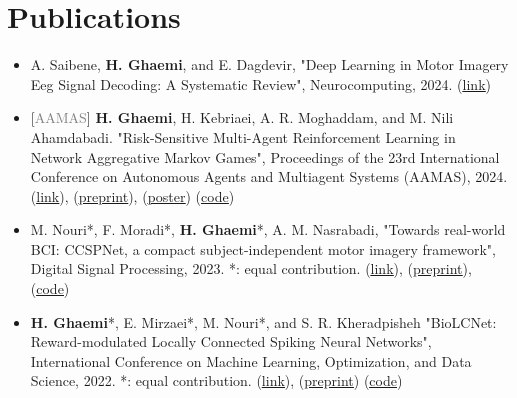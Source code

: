 \documentclass[A4,11pt]{article}
\makeatletter
\newcommand{\CVItem}[1]{
  \item\small{
    {#1 \vspace{-2pt}}
  }
}
\newcommand{\CVSubheading}[4]{
  \vspace{-2pt}\item
    \begin{tabular*}{0.97\textwidth}[t]{l@{\extracolsep{\fill}}r}
      \textbf{#1} & #2 \\
      \small#3 & \small #4 \\
    \end{tabular*}\vspace{-7pt}
}
\newcommand{\CVItemListStart}{\begin{itemize}}
\newcommand{\CVItemListEnd}{\end{itemize}\vspace{-5pt}}
\makeatother
\begin{document}

\section{Publications}
\CVItemListStart
\CVItem{A. Saibene, \textbf{H. Ghaemi}, and E. Dagdevir, "Deep Learning in Motor Imagery Eeg Signal Decoding: A Systematic Review", Neurocomputing, 2024. (\href{https://www.sciencedirect.com/science/article/abs/pii/S0925231224013481}{\underline{link}})}

\CVItem{[\textcolor{gray}{{AAMAS}}] \textbf{H. Ghaemi}, H. Kebriaei, A. R. Moghaddam, and M. Nili Ahamdabadi. "Risk-Sensitive Multi-Agent Reinforcement Learning in Network Aggregative Markov Games", Proceedings of the 23rd International Conference on Autonomous Agents and Multiagent Systems (AAMAS), 2024. (\href{https://dl.acm.org/doi/10.5555/3635637.3663134}{\underline{link}}), (\href{https://arxiv.org/abs/2402.05906}{\underline{preprint}}), (\href{https://github.com/hafezgh/risk-sensitive-marl-namg/blob/main/Poster_RSMARL_AAMAS2024.pdf}{\underline{poster}}) (\href{https://github.com/hafezgh/risk-sensitive-marl-namg/}{\underline{code}})}

\CVItem{M. Nouri*, F. Moradi*, \textbf{H. Ghaemi}*, A. M. Nasrabadi, "Towards real-world BCI: CCSPNet, a compact subject-independent motor imagery framework", Digital Signal Processing, 2023. *: equal contribution. (\href{https://doi.org/10.1016/j.dsp.2022.103816}{\underline{link}}), (\href{https://arxiv.org/abs/2012.13567}{\underline{preprint}}), (\href{https://github.com/Singular-Brain/CCSPNet}{\underline{code}})}

\CVItem{\textbf{H. Ghaemi}*, E. Mirzaei*, M. Nouri*, and S. R. Kheradpisheh "BioLCNet: Reward-modulated Locally Connected Spiking Neural Networks", International Conference on Machine Learning, Optimization, and Data Science, 2022. *: equal contribution. (\href{https://doi.org/10.1007/978-3-031-25891-6_42}{\underline{link}}), (\href{https://arxiv.org/abs/2109.05539}{\underline{preprint}}) (\href{https://github.com/Singular-Brain/BioLCNet}{\underline{code}})}


\CVItemListEnd
\end{document}
